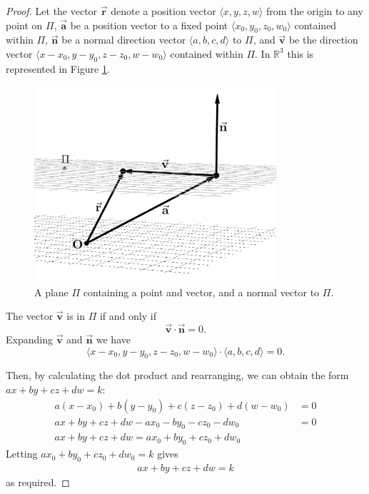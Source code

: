 \begin{proof}
    Let the vector $\Vec{\mathbf{r}}$ denote a position vector $\langle x, y, z, w\rangle$ from the origin to any point on $\Pi$, $\Vec{\mathbf{a}}$ be a position vector to a fixed point $\langle x_0, y_0, z_0, w_0\rangle$ contained within $\Pi$, $\Vec{\mathbf{n}}$ be a normal direction vector $\langle a, b, c, d\rangle$ to $\Pi$, and $\Vec{\mathbf{v}}$ be the direction vector $\langle x-x_0, y-y_0, z-z_0, w-w_0\rangle$ contained within $\Pi$. In $\mathbb{R}^3$ this is represented in Figure \ref{fig:plane equation proof setup}.
    \begin{figure}[H]
        \centering
        \includegraphics[width=0.8\textwidth]{images/vector equation of plane.png}
        \caption{A plane $\Pi$ containing a point and vector, and a normal vector to $\Pi$.}
        \label{fig:plane equation proof setup}
    \end{figure}
    
    \noindent
    The vector $\Vec{\mathbf{v}}$ is in $\Pi$ if and only if $$\Vec{\mathbf{v}} \cdot \Vec{\mathbf{n}} = 0.$$ Expanding $\Vec{\mathbf{v}}$ and $\Vec{\mathbf{n}}$ we have $$\langle x-x_0, y-y_0, z-z_0, w-w_0\rangle \cdot \langle a, b, c, d\rangle = 0.$$
    
    \noindent
    Then, by calculating the dot product and rearranging, we can obtain the form $ax+by+cz+dw=k$:
    \begin{align*}
        a(x-x_0)+b(y-y_0)+c(z-z_0)+d(w-w_0) &= 0\\
        ax+by+cz+dw-ax_0-by_0-cz_0-dw_0 &= 0\\
        ax+by+cz+dw = ax_0+by_0+cz_0+dw_0
    \end{align*}
    Letting $ax_0+by_0+cz_0+dw_0=k$ gives
    \begin{align*}
        ax+by+cz+dw = k
    \end{align*}
    as required.
\end{proof}

